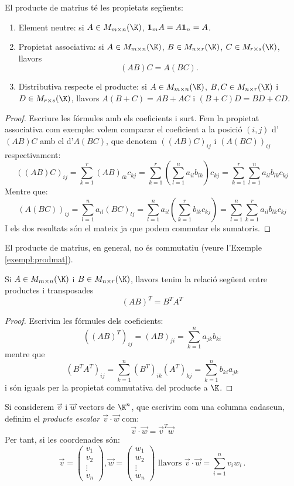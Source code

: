 \begin{proposicio}
	El producte de matrius té les propietats següents:
	\begin{enumerate}[\rm (a)]
		\item Element neutre: si $A \in M_{m\times n}(\K)$, $\mathbf{1}_m A = A \mathbf{1}_n = A$.
		\item Propietat associativa: si $A \in M_{m\times n}(\K)$, $B \in M_{n\times r}(\K)$, $C \in M_{r\times s}(\K)$, llavors
		\[(AB)C=A(BC).\]
		\item Distributiva respecte el producte: si $A \in M_{m\times n}(\K)$, $B, C \in M_{n\times r}(\K)$ i $D \in M_{r\times s}(\K)$, llavors $A(B+C)=AB+AC$ i $(B+C)D=BD+CD$.
	\end{enumerate}
\end{proposicio}
\begin{proof}
	Escriure les fórmules amb els coeficients i surt. Fem la propietat associativa com exemple: volem comparar el coeficient a la posició $(i,j)$ d'$(AB)C$ amb el d'$A(BC)$, que denotem $((AB)C)_{ij}$ i $(A(BC))_{ij}$ respectivament:
	$$
	((AB)C)_{ij}=\sum_{k=1}^r(AB)_{ik}c_{kj}=\sum_{k=1}^r(\sum_{l=1}^na_{il}b_{lk})c_{kj}=\sum_{k=1}^r\sum_{l=1}^na_{il}b_{lk}c_{kj}
	$$
	Mentre que:
	$$
	(A(BC))_{ij}=\sum_{l=1}^na_{il}(BC)_{lj}=\sum_{l=1}^na_{il}(\sum_{k=1}^rb_{lk}c_{kj})=\sum_{l=1}^n\sum_{k=1}^ra_{il}b_{lk}c_{kj}
	$$
	I els dos resultats són el mateix ja que podem commutar els sumatoris.
\end{proof}
\begin{observacio}
	El producte de matrius, en general, no és commutatiu (veure l'Exemple \ref{exempl:prodmat}).
\end{observacio}
\begin{proposicio}
	Si $A\in M_{m\times n}(\K)$ i $B\in M_{n\times r}(\K)$, llavors tenim la relació següent entre productes i transposades
	$$
	(AB)^T=B^T A^T
	$$
\end{proposicio}
\begin{proof}
	Escrivim les fórmules dels coeficients:
	$$
	((AB)^T)_{ij}=(AB)_{ji}=\sum_{k=1}^n a_{jk}b_{ki}
	$$
	mentre que
	$$
	(B^TA^T)_{ij}=\sum_{k=1}^n (B^T)_{ik}(A^T)_{kj}=\sum_{k=1}^n b_{ki}a_{jk}
	$$
	i són iguals per la propietat commutativa del producte a $\K$.
\end{proof}
\begin{definicio}
	Si considerem $\vec{v}$ i $\vec{w}$ vectors de $\K^n$, que escrivim com una columna cadascun, definim el \emph{producte escalar $\vec{v}\cdot\vec{w}$} com:
	$$
	\vec{v}\cdot \vec{w}=\vec{v}^T \vec{w}
	$$
	Per tant, si les coordenades són:
	$$
	\vec{v}=\begin{pmatrix}
	v_1 \\ v_2 \\ \vdots \\ v_n 
	\end{pmatrix}, 
	\vec{w}=\begin{pmatrix}
	w_1 \\ w_2 \\ \vdots \\ w_n 
	\end{pmatrix}
	\text{ llavors }
	\vec{v}\cdot\vec{w}=\sum_{i=1}^n v_iw_i \,.
	$$
\end{definicio}

